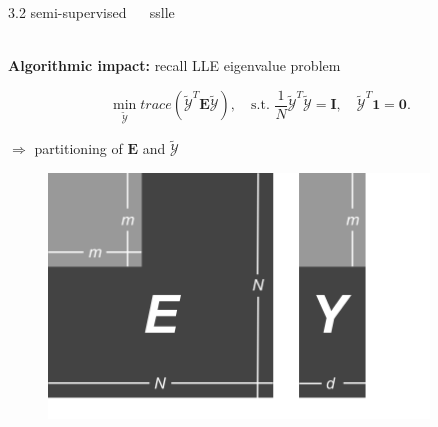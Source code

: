 \documentclass[11pt, compress, t, notes = noshow, xcolor = table, 
aspectratio = 1610]{beamer}
\newcommand{\Y}{\mathcal{Y}}
\newcommand{\Ytil}{\tilde{\Y}}
\newcommand{\E}{\bm{E}}
\newcommand{\I}{\bm{I}}
\begin{document}
\begin{frame}{\textcolor{gray!90}{3.2 semi-supervised} ~~ sslle}
\begin{minipage}[t]{0.6\textwidth}
\phantom{foo} \\
\textbf{Algorithmic impact:} recall LLE eigenvalue problem
\begin{fleqn}
  \begin{equation*}
    \min_{\Ytil} \mathit{trace}(\Ytil^T \E \Ytil), \quad
    \text{s.t. } \frac{1}{N} \Ytil^T \Ytil = \I, \quad
    \Ytil^T\bm{1} = \bm{0}.
  \end{equation*}
\end{fleqn}
$\Rightarrow$ partitioning of $\E$ and $\Ytil$ \\
\end{minipage}%
\begin{minipage}[t]{0.05\textwidth}
  \phantom{foo}
\end{minipage}%
\begin{minipage}[t]{0.35\textwidth}
  \begin{figure}[H]
    \includegraphics[trim = 0 0 0 0, clip, %
      width = 0.9\textwidth]{figures/matrix_partition}
  \end{figure}
\end{minipage}

\end{frame}

\end{document}
